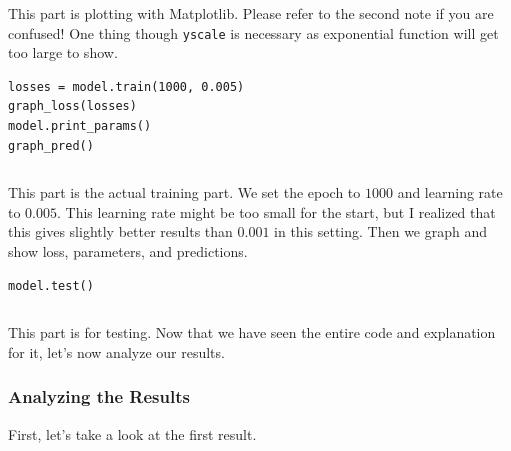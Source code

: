 \documentclass[../../main.tex]{subfiles}
\begin{document}
This part is plotting with Matplotlib. Please refer to the second
note if you are confused! One thing though \verb|yscale| is necessary
as exponential function will get too large to show.

\begin{jupyter}
\begin{lstlisting}[style=jin]
losses = model.train(1000, 0.005)
graph_loss(losses)
model.print_params()
graph_pred()
\end{lstlisting}
\begin{lstlisting}[style=jout]
\end{lstlisting}
\end{jupyter}

This part is the actual training part. We set the epoch to $1000$
and learning rate to $0.005$. This learning rate might be too small
for the start, but I realized that this gives slightly better results
than $0.001$ in this setting. Then we graph and show loss, parameters,
and predictions.

\begin{jupyter}
\begin{lstlisting}[style=jin]
model.test()
\end{lstlisting}
\begin{lstlisting}[style=jout]
\end{lstlisting}
\end{jupyter}

This part is for testing. Now that we have seen the entire code and
explanation for it, let's now analyze our results.

\subsubsection{Analyzing the Results}

First, let's take a look at the first result.
\end{document}
